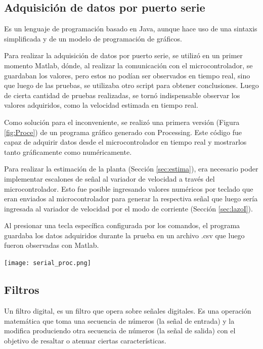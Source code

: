 \subsection{Adquisición de datos por puerto serie}
\begin{tcolorbox}[colback=blue!5!white,colframe=blue!75!black,title=Processing]
	\cite{processing}Es un lenguaje de programación basado en Java, aunque hace uso de una sintaxis simplificada y de un modelo de programación de gráficos.
\end{tcolorbox}
Para realizar la adquisición de datos por puerto serie, se utilizó en un primer momento Matlab, dónde, al realizar la comunicación con el microcontrolador, se guardaban los valores, pero estos no podían ser observados en tiempo real, sino que luego de las pruebas, se utilizaba otro script para obtener conclusiones. Luego de cierta cantidad de pruebas realizadas, se tornó indispensable observar los valores adquiridos, como la velocidad estimada en tiempo real.

Como solución para el inconveniente, se realizó una primera versión (Figura \ref{fig:Proce}) de un programa gráfico generado con Processing. Este código fue capaz de adquirir datos desde el microcontrolador en tiempo real y mostrarlos tanto gráficamente como numéricamente. 

Para realizar la estimación de la planta (Sección \ref{sec:estima}), era necesario poder implementar escalones de señal al variador de velocidad a través del microcontrolador. Esto fue posible ingresando valores numéricos por teclado que eran enviados al microcontrolador para generar la respectiva señal que luego sería ingresada al variador de velocidad por el modo de corriente (Sección \ref{sec:lazoI}).

Al presionar una tecla específica configurada por los comandos, el programa guardaba los datos adquiridos durante la prueba en un archivo .csv que luego fueron observadas con Matlab.

\begin{center}
	\texttt{[image: serial\_proc.png]}
	\label{fig:Proce}    
\end{center}




\subsection{Filtros}
\begin{tcolorbox}[colback=blue!5!white,colframe=blue!75!black,title=Filtro digital]
	Un filtro digital, es un filtro que opera sobre señales digitales. Es una operación	matemática que toma una secuencia de números (la señal de entrada) y la
	modifica produciendo otra secuencia de números (la señal de salida) con el objetivo de resaltar o atenuar ciertas características.
\end{tcolorbox}

